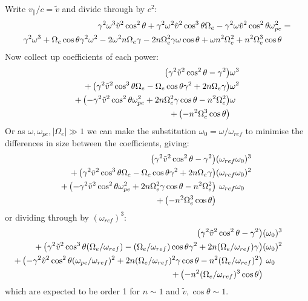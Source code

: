 \documentclass[]{article}
\begin{document}
Write $v_\parallel / c = \tilde{v}$ and divide through by $c^2$:
\begin{align}
\gamma^2\omega^3 \tilde{v}^2 \cos^2 \theta + \gamma^2 \omega^2 \tilde{v}^2 \cos^3\theta\Omega_e - \gamma^2\omega \tilde{v}^2\cos^2\theta\omega_{pe}^2 &=\notag\\ \gamma^2 \omega^3 +  \Omega_e\cos\theta \gamma^2\omega^2 - 2  \omega^2 n\Omega_e\gamma - 2  n \Omega_e^2 \gamma\omega\cos\theta +  \omega n^2\Omega_e^2 +  n^2\Omega_e^3\cos\theta&
\end{align}
Now collect up coefficients of each power:
\begin{align}
\left(\gamma^2 \tilde{v}^2 \cos^2 \theta - \gamma^2   \right)&\omega^3  \notag\\
+\left(\gamma^2 \tilde{v}^2 \cos^3\theta\Omega_e  -\Omega_e\cos\theta \gamma^2  + 2 n\Omega_e\gamma  \right)&\omega^2  \notag\\
+\left(- \gamma^2 \tilde{v}^2\cos^2\theta\omega_{pe}^2  +2  n \Omega_e^2 \gamma\cos\theta  - n^2\Omega_e^2   \right)&\omega \notag\\
+\left(  -n^2\Omega_e^3\cos\theta   \right)&
\end{align}
Or as $\omega , \omega_{pe}, |\Omega_e| \gg 1$ we can make the substitution $ \omega_0 = \omega/\omega_{ref}$ to minimise the differences in size between the coefficients, giving:
\begin{align}
\left(\gamma^2 \tilde{v}^2 \cos^2 \theta - \gamma^2   \right)&(\omega_{ref}\omega_0)^3 \notag \\
+\left(\gamma^2 \tilde{v}^2 \cos^3\theta\Omega_e  -\Omega_e\cos\theta \gamma^2  + 2 n\Omega_e\gamma  \right)&(\omega_{ref}\omega_0)^2  \notag\\
+\left(- \gamma^2 \tilde{v}^2\cos^2\theta\omega_{pe}^2  +2  n \Omega_e^2 \gamma\cos\theta  - n^2\Omega_e^2   \right)&\phantom{(}\omega_{ref}\omega_0\phantom{)^2}  \notag\\
+\left(  -n^2\Omega_e^3\cos\theta   \right)&\phantom{(\omega_ref\omega_0)^2} 
\end{align}
or dividing through by $(\omega_{ref})^3$:
\begin{align}
\left(\gamma^2 \tilde{v}^2 \cos^2 \theta - \gamma^2   \right)&(\omega_0)^3 \notag \\
+\left(\gamma^2 \tilde{v}^2 \cos^3\theta(\Omega_e/\omega_{ref})  -(\Omega_e/\omega_{ref})\cos\theta \gamma^2  + 2 n(\Omega_e/\omega_{ref})\gamma  \right)&(\omega_0)^2  \notag\\
+\left(- \gamma^2 \tilde{v}^2\cos^2\theta(\omega_{pe}/\omega_{ref})^2  +2  n (\Omega_e/\omega_{ref})^2 \gamma\cos\theta  - n^2(\Omega_e/\omega_{ref})^2   \right)&\phantom{(}\omega_0\phantom{)^2}  \notag\\
+\left(  -n^2(\Omega_e/\omega_{ref})^3\cos\theta   \right)&\phantom{(\omega_ref\omega_0)^2} 
\end{align}
which are expected to be order 1 for $n \sim 1$ and $\tilde{v}, \cos\theta \sim 1$.
\end{document}
